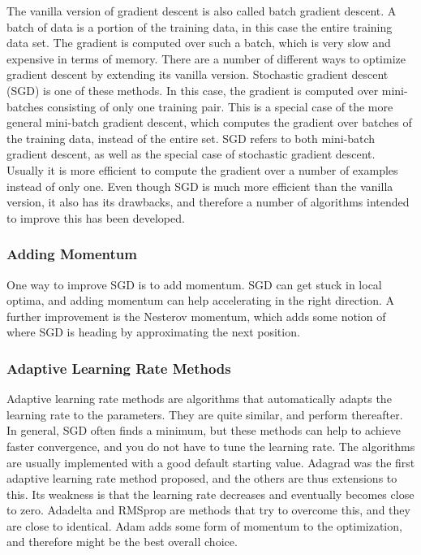 The vanilla version of gradient descent is also called batch gradient descent. A batch of data is a portion of the training data, in this case the entire training data set. The gradient is computed over such a batch, which is very slow and expensive in terms of memory. There are a number of different ways to optimize gradient descent by extending its vanilla version. Stochastic gradient descent (SGD) is one of these methods. In this case, the gradient is computed over mini-batches consisting of only one training pair. This is a special case of the more general mini-batch gradient descent, which computes the gradient over batches of the training data, instead of the entire set. SGD refers to both mini-batch gradient descent, as well as the special case of stochastic gradient descent. Usually it is more efficient to compute the gradient over a number of examples instead of only one. Even though SGD is much more efficient than the vanilla version, it also has its drawbacks, and therefore a number of algorithms intended to improve this has been developed.

\subsubsection{Adding Momentum}

One way to improve SGD is to add momentum. SGD can get stuck in local optima, and adding momentum can help accelerating in the right direction. A further improvement is the Nesterov momentum, which adds some notion of where SGD is heading by approximating the next position.

\subsubsection{Adaptive Learning Rate Methods}

Adaptive learning rate methods are algorithms that automatically adapts the learning rate to the parameters. They are quite similar, and perform thereafter. In general, SGD often finds a minimum, but these methods can help to achieve faster convergence, and you do not have to tune the learning rate. The algorithms are usually implemented with a good default starting value. Adagrad was the first adaptive learning rate method proposed, and the others are thus extensions to this. Its weakness is that the learning rate decreases and eventually becomes close to zero. Adadelta and RMSprop are methods that try to overcome this, and they are close to identical. Adam adds some form of momentum to the optimization, and therefore might be the best overall choice.

